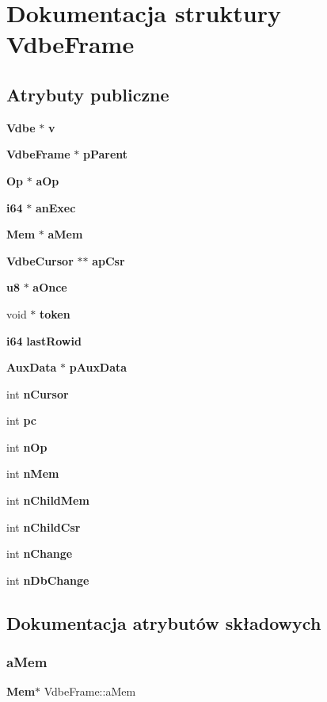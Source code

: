 \section{Dokumentacja struktury Vdbe\+Frame}
\label{struct_vdbe_frame}
\subsection*{Atrybuty publiczne}
\begin{DoxyCompactItemize}
\item 
\textbf{ Vdbe} $\ast$ \textbf{ v}
\item 
\textbf{ Vdbe\+Frame} $\ast$ \textbf{ p\+Parent}
\item 
\textbf{ Op} $\ast$ \textbf{ a\+Op}
\item 
\textbf{ i64} $\ast$ \textbf{ an\+Exec}
\item 
\textbf{ Mem} $\ast$ \textbf{ a\+Mem}
\item 
\textbf{ Vdbe\+Cursor} $\ast$$\ast$ \textbf{ ap\+Csr}
\item 
\textbf{ u8} $\ast$ \textbf{ a\+Once}
\item 
void $\ast$ \textbf{ token}
\item 
\textbf{ i64} \textbf{ last\+Rowid}
\item 
\textbf{ Aux\+Data} $\ast$ \textbf{ p\+Aux\+Data}
\item 
int \textbf{ n\+Cursor}
\item 
int \textbf{ pc}
\item 
int \textbf{ n\+Op}
\item 
int \textbf{ n\+Mem}
\item 
int \textbf{ n\+Child\+Mem}
\item 
int \textbf{ n\+Child\+Csr}
\item 
int \textbf{ n\+Change}
\item 
int \textbf{ n\+Db\+Change}
\end{DoxyCompactItemize}


\subsection{Dokumentacja atrybutów składowych}
\mbox{\label{struct_vdbe_frame_a98b9eabf633e77d4ae2dfe9d13a43fdf}} 
\subsubsection{aMem}
{\footnotesize\ttfamily \textbf{ Mem}$\ast$ Vdbe\+Frame\+::a\+Mem}

